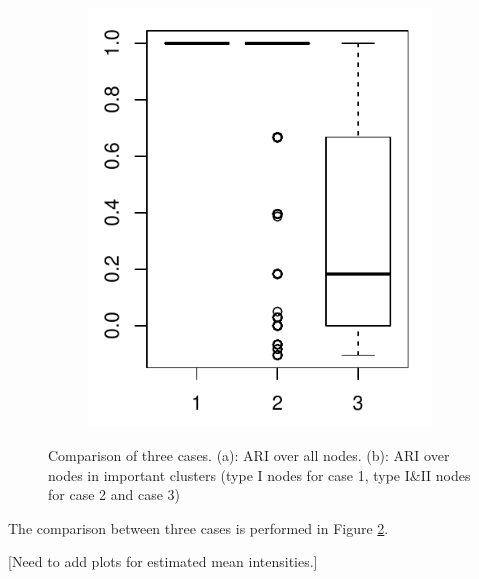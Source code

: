 \begin{figure}[H]
\begin{subfigure}{.45\textwidth}
\includegraphics[width=\linewidth]{../simulation/plots/ARI_4or12_123_boxplot}
\caption{}
\label{fig: ARI boxplot cmpr, impt clus only}
\end{subfigure}
\caption{Comparison of three cases. (a): ARI over all nodes. (b): ARI over nodes in important clusters (type I nodes for case 1, type I\&II nodes for case 2 and case 3)
}
\label{fig: ARI boxplot cmpr}
\end{figure}

\noindent
The comparison between three cases is performed in Figure \ref{fig: ARI boxplot cmpr}.


[Need to add plots for estimated mean intensities.]



